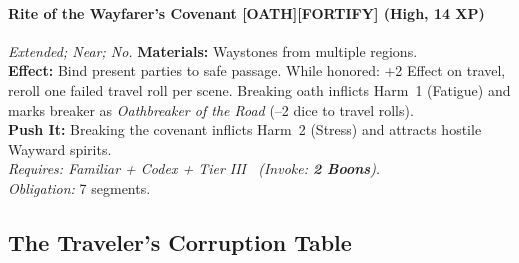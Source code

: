 \paragraph{Rite of the Wayfarer's Covenant \textnormal{[OATH][FORTIFY]} (High, 14 XP)} \emph{Extended; Near; No.}
\textbf{Materials:} Waystones from multiple regions.\\
\textbf{Effect:} Bind present parties to safe passage. While honored: +2 Effect on travel, reroll one failed travel roll per scene. Breaking oath inflicts Harm~1 (Fatigue) and marks breaker as \emph{Oathbreaker of the Road} (–2 dice to travel rolls).\\
\textbf{Push It:} Breaking the covenant inflicts Harm~2 (Stress) and attracts hostile Wayward spirits.\\
\emph{Requires: Familiar + Codex + Tier III \ (\textit{Invoke:} \textbf{2 Boons}).}\\
\emph{Obligation:} 7 segments.

\subsection*{The Traveler's Corruption Table}
\label{sec:traveler-corruption}

